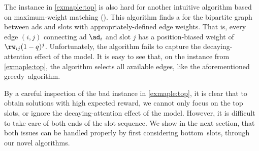 The instance in \cref{exmaple:top} is also hard for another intuitive algorithm based on maximum-weight matching (\mwm).
This algorithm finds a \mwm for the bipartite graph between ads and slots with appropriately-defined edge weights.
That is, every edge $(i,j)$ connecting ad $\ad_i$ and slot $j$ has a position-biased weight of $\rw_{ij} (1-q)^{j}$.
Unfortunately, the \mwm algorithm fails to capture the decaying-attention effect of the model.
It is easy to see that, on the instance from \cref{exmaple:top}, the \mwm algorithm selects all available edges, like the afore\-mentioned greedy~algorithm.

By a careful inspection of the bad instance in \cref{exmaple:top}, 
it is clear that to obtain solutions with high expected reward, 
we cannot only focus on the top slots, 
or
ignore the decaying-attention effect of the model.
However, it is difficult to take care of both ends of the slot sequence. %
We show in the next section, that both issues can be handled properly by %
first considering 
bottom~slots, through our novel algorithms.

%
%
